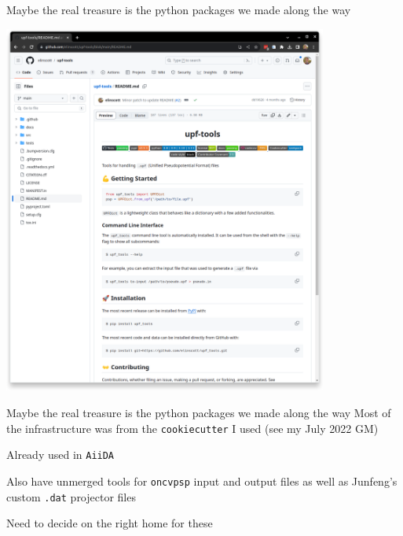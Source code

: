 \documentclass[xcolor=table,aspectratio=169]{beamer}
\numberwithin{equation}{section}
\begin{document}
\begin{frame}{\footnotesize Maybe the real treasure is the python packages we made along the way}

    \includegraphics[width=0.8\textwidth]{figures/upf_tools.png}

\end{frame}

\begin{frame}{\footnotesize Maybe the real treasure is the python packages we made along the way}
    Most of the infrastructure was from the \texttt{cookiecutter} I used (see my July 2022 GM)

    Already used in \texttt{AiiDA}

    Also have unmerged tools for \texttt{oncvpsp} input and output files as well as Junfeng's custom \texttt{.dat} projector files

    Need to decide on the right home for these
    
\end{frame}
\end{document}
